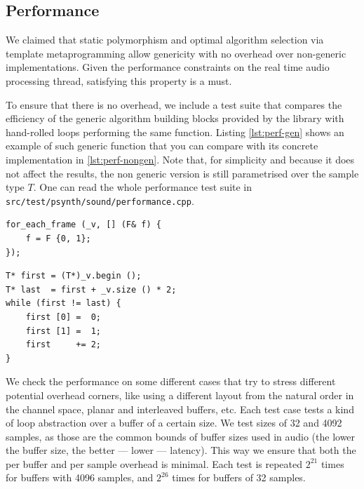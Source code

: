 \subsection{Performance}
\label{sec:sound-performance}

We claimed that static polymorphism and optimal algorithm selection
via template metaprogramming allow genericity with no overhead over
non-generic implementations. Given the performance constraints on the
real time audio processing thread, satisfying this property is a must.

To ensure that there is no overhead, we include a test suite that
compares the efficiency of the generic algorithm building blocks
provided by the library with hand-rolled loops performing the same
function. Listing \ref{lst:perf-gen} shows an example of such generic
function that you can compare with its concrete implementation in
\ref{lst:perf-nongen}. Note that, for simplicity and because it does
not affect the results, the non generic version is still parametrised
over the sample type $T$. One can read the whole performance test
suite in \texttt{src/test/psynth/sound/performance.cpp}.

\begin{lstlisting}[float=h,
  caption={Generic \texttt{for\_each} that asigns $(0,1)$ to every
  frame over non interleaved data},
  label=lst:perf-gen]
for_each_frame (_v, [] (F& f) { 
    f = F {0, 1};
});
\end{lstlisting}

\begin{lstlisting}[float=h,
  caption={Non generic \texttt{for\_each} that asigns $(0,1)$ to every
  frame over non interleaved data},
  label=lst:perf-nongen]
T* first = (T*)_v.begin ();
T* last  = first + _v.size () * 2;
while (first != last) {
    first [0] =  0;
    first [1] =  1;
    first     += 2;
}
\end{lstlisting}

We check the performance on some different cases that try to stress
different potential overhead corners, like using a different layout
from the natural order in the channel space, planar and interleaved
buffers, etc. Each test case tests a kind of loop abstraction over a
buffer of a certain size. We test sizes of 32 and 4092 samples, as
those are the common bounds of buffer sizes used in audio (the lower
the buffer size, the better --- lower --- latency). This way we ensure
that both the per buffer and per sample overhead is minimal. Each test
is repeated $2^{21}$ times for buffers with 4096 samples, and $2^{26}$
times for buffers of 32 samples.

